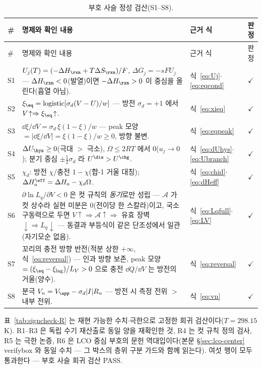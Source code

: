 \begin{longtable}{@{}l p{8.6cm} p{3.3cm} c@{}}
\caption{부호 사슬 정성 검산(S1--S8).}\label{tab:signcheck-S}\\
\toprule
\# & 명제와 확인 내용 & 근거 식 & 판정 \\
\midrule
\endfirsthead
\toprule
\# & 명제와 확인 내용 & 근거 식 & 판정 \\
\midrule
\endhead
S1 & $U_j(T)=(-\Delta H_\rxn+T\Delta S_\rxn)/F$, $\Delta G_j=-sFU_j$ --- $\Delta H_\rxn<0$(발열)이면
$-\Delta H_\rxn>0$ 이 중심을 올린다(흡열 아님). & 식~\eqref{eq:Uj}$\cdot$\eqref{eq:eqcond} & $\checkmark$ \\
S2 & $\xi_\eq=\mathrm{logistic}[\sigma_d(V-U)/w]$ --- 방전 $\sigma_d=+1$ 에서
$V\!\uparrow\Rightarrow\xi_\eq\!\uparrow$. & 식~\eqref{eq:xieq} & $\checkmark$ \\
S3 & $\dd\xi/\dd V=\sigma_d\,\xi(1-\xi)/w$ --- peak 모양 $=|\dd\xi/\dd V|=\xi(1-\xi)/w\ge0$, 방향 불변.
& 식~\eqref{eq:eqpeak} & $\checkmark$ \\
S4 & $\Delta U_\hys\ge0$(극대 $>$ 극소), $\Omega\le2RT$ 에서 $0$($u_j\to0$); 분기 중심 $\pm\tfrac12\sigma_d$
라 $U^{\dis}>U^{\chg}$. & 식~\eqref{eq:dUhys}$\cdot$ \eqref{eq:Ubranch} & $\checkmark$ \\
S5 & $\chi_d$: 방전 $\chi$/충전 $1-\chi$(합-1 거울 대칭); $\Delta H_a^\eff=\Delta H_a-\chi_d\Omega$.
& 식~\eqref{eq:chid}$\cdot$\eqref{eq:dHeff} & $\checkmark$ \\
S6 & $\partial\ln L_q/\partial V<0$ 은 컷 규칙의 \emph{동기}로만 성립 --- $\mathcal A$ 가 컷 상수라 실현
미분은 $0$(전이당 한 스칼라)이고, 국소 구동력으로 두면 $V\!\uparrow\Rightarrow\mathcal
A\!\uparrow\Rightarrow$ 유효 장벽 $\downarrow\Rightarrow L_q\downarrow$ --- 동결과 부등식이 같은
단조성에서 일관(자기모순 없음). & 식~\eqref{eq:Lqfull}$\cdot$\eqref{eq:LV} & $\checkmark$ \\
S7 & 꼬리의 충전 방향 반전(적분 상한 $+\infty$, 식~\eqref{eq:reversal}) --- 인과 방향 보존,
peak 모양 $=(\xi_\eq-\xi_\mathrm{lag})/L_V>0$ 으로 충전 $\dd Q/\dd V$ 는 방전의 거울(양수).
& 식~\eqref{eq:reversal} & $\checkmark$ \\
S8 & 분극 $V_n=V_\app-\sigma_d|I|R_n$ --- 방전 시 측정 전위 $>$ 내부 전위. & 식~\eqref{eq:vn} & $\checkmark$ \\
\bottomrule
\end{longtable}

표~\ref{tab:signcheck-R} 는 재현 가능한 수치$\cdot$극한으로 고정한 회귀 검산이다($T=298.15$ K).
R1--R3 은 독립 수기 재산출로 동일 양을 재확인한 것, R4 는 컷 규칙 정의 검사, R5 는 극한 논증,
R6 은 LCO 중심 부호의 문헌 역대입이다(본문 \S\ref{sec:lco-center} verifybox 와 동일 수치 ---
그 박스의 층위 구분 가드와 함께 읽는다). 여섯 행이 모두 통과한다 --- 부호 사슬 회귀 검산 PASS.


